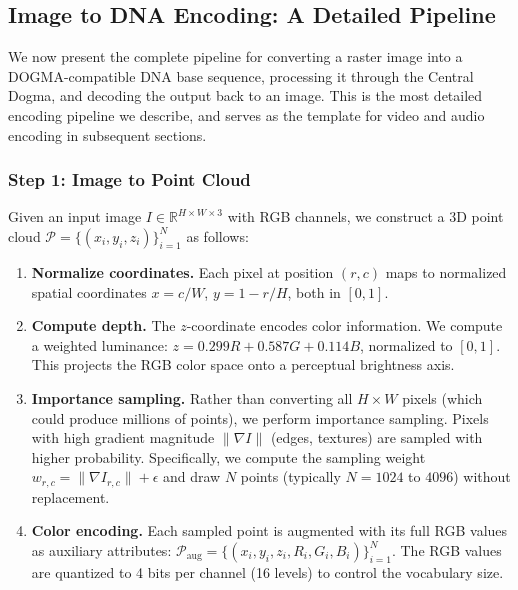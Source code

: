 \subsection{Image to DNA Encoding: A Detailed Pipeline}
\label{sec:image-to-dna}

We now present the complete pipeline for converting a raster image into a DOGMA-compatible DNA base sequence, processing it through the Central Dogma, and decoding the output back to an image. This is the most detailed encoding pipeline we describe, and serves as the template for video and audio encoding in subsequent sections.

\subsubsection{Step 1: Image to Point Cloud}

Given an input image $I \in \mathbb{R}^{H \times W \times 3}$ with RGB channels, we construct a 3D point cloud $\mathcal{P} = \{(x_i, y_i, z_i)\}_{i=1}^{N}$ as follows:

\begin{enumerate}[leftmargin=1.8em]
  \item \textbf{Normalize coordinates.} Each pixel at position $(r, c)$ maps to normalized spatial coordinates $x = c / W$, $y = 1 - r / H$, both in $[0, 1]$.
  \item \textbf{Compute depth.} The $z$-coordinate encodes color information. We compute a weighted luminance: $z = 0.299 R + 0.587 G + 0.114 B$, normalized to $[0, 1]$. This projects the RGB color space onto a perceptual brightness axis.
  \item \textbf{Importance sampling.} Rather than converting all $H \times W$ pixels (which could produce millions of points), we perform importance sampling. Pixels with high gradient magnitude $\|\nabla I\|$ (edges, textures) are sampled with higher probability. Specifically, we compute the sampling weight $w_{r,c} = \|\nabla I_{r,c}\| + \epsilon$ and draw $N$ points (typically $N = 1024$ to $4096$) without replacement.
  \item \textbf{Color encoding.} Each sampled point is augmented with its full RGB values as auxiliary attributes: $\mathcal{P}_{\text{aug}} = \{(x_i, y_i, z_i, R_i, G_i, B_i)\}_{i=1}^{N}$. The RGB values are quantized to 4 bits per channel (16 levels) to control the vocabulary size.
\end{enumerate}

